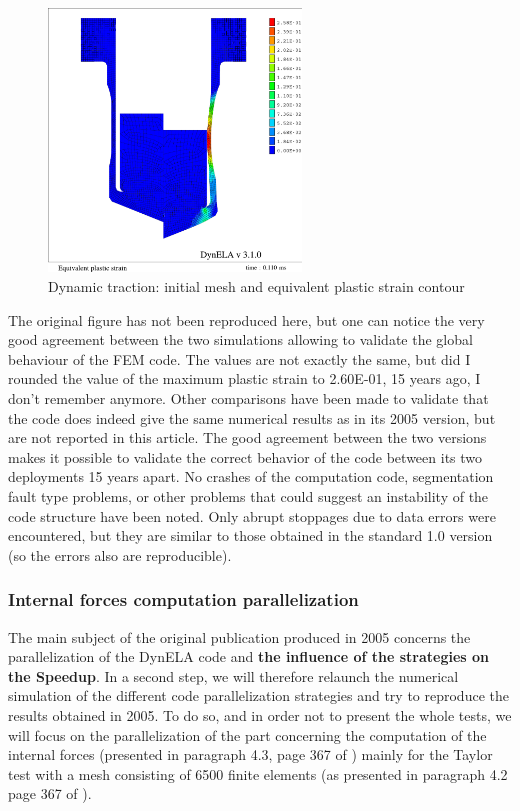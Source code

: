 \begin{figure}[h!] 
  \centering
  \includegraphics[width=0.6\textwidth]{./strain.pdf}
  \caption{Dynamic traction: initial mesh and equivalent plastic strain contour}
  \label{strain}
\end{figure}
The original figure has not been reproduced here, but one can notice the very good agreement between the two simulations allowing to validate the global behaviour of the FEM code. The values are not exactly the same, but did I rounded the value of the maximum plastic strain to 2.60E-01, 15 years ago, I don't remember anymore. Other comparisons have been made to validate that the code does indeed give the same numerical results as in its 2005 version, but are not reported in this article. The good agreement between the two versions makes it possible to validate the correct behavior of the code between its two deployments 15 years apart. No crashes of the computation code, segmentation fault type problems, or other problems that could suggest an instability of the code structure have been noted. Only abrupt stoppages due to data errors were encountered, but they are similar to those obtained in the standard 1.0 version (so the errors also are reproducible).

\subsubsection{Internal forces computation parallelization}

The main subject of the original publication produced in 2005 concerns the parallelization of the DynELA code and \textbf{the influence of the strategies on the Speedup}. In a second step, we will therefore relaunch the numerical simulation of the different code parallelization strategies and try to reproduce the results obtained in 2005. To do so, and in order not to present the whole tests, we will focus on the parallelization of the part concerning the computation of the internal forces (presented in paragraph 4.3, page 367 of \cite{Pantale:2005}) mainly for the Taylor test with a mesh consisting of 6500 finite elements (as presented in paragraph 4.2 page 367 of \cite{Pantale:2005}). 


